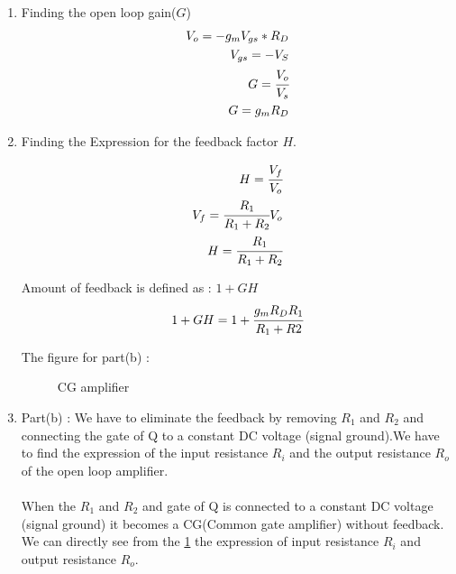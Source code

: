 \begin{enumerate}[label=\arabic*.,ref=\theenumi]
\item Finding the open loop gain($G$)\\
\solution
\begin{align}
V_{o} = -g_{m}V_{gs}*R_{D}\\
V_{gs} = -V_{S}\\
G = \cfrac{V_{o}}{V_{s}}\\
G = g_{m}R_{D}
\end{align}

\item Finding the Expression for the feedback factor $H$.\\
\solution

\begin{align}
H = \cfrac{V_{f}}{V_{o}}\\
V_{f} = \cfrac{R_{1}}{R_{1}+R_{2}}V_{o}\\
H = \cfrac{R_{1}}{R_{1}+R_{2}}
\end{align}


Amount of feedback is defined as : $1+GH$
\begin{align}
1+GH = 1 + \cfrac{g_{m}R_{D}R_{1}}{R_{1}+R{2}} 
\end{align}




The figure for part(b) :

\begin{figure}[h!]
	\begin{center}
		\resizebox{\columnwidth/1}{!}{}
	\end{center}
	\caption{CG amplifier}
	\label{fig:CG amplifier}
\end{figure}

\item Part(b) : We have to eliminate the feedback by removing $R_{1}$ and $R_{2}$ and connecting the gate of Q to a constant DC voltage (signal ground).We have to find the expression of the input resistance  $R_{i}$ and the output resistance $R_{o}$ of the open loop amplifier.\\
\solution\\
When the $R_{1}$ and $R_{2}$ and gate of Q is connected to a constant DC voltage (signal ground) it becomes a CG(Common gate amplifier) without feedback.
We can directly see from the \ref{fig:CG amplifier} the expression of input resistance $R_{i}$ and output resistance $R_{o}$.



\end{enumerate}
